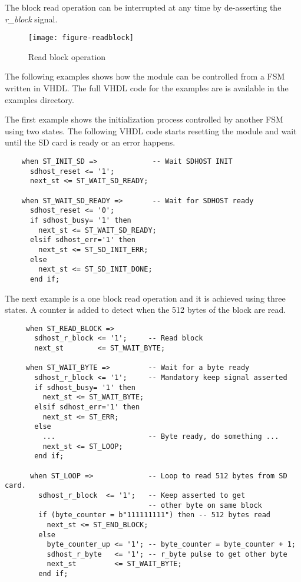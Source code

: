 \documentclass[oneside]{article}
\begin{document}
The block read operation can be interrupted at any time by de-asserting the
\emph{r\_block} signal.

\begin{figure}[H]
\centering
\texttt{[image: figure-readblock]}
\caption{Read block operation}
\label{fig-readblock}
\end{figure}

The following examples shows how the module can be controlled from a FSM 
written in VHDL. The full VHDL code for the examples are is available in the 
examples directory.

The first example shows the initialization process controlled by another FSM 
using two states. The following VHDL code  starts resetting the module and wait 
until the SD card is ready or an error happens. 

\begin{verbatim}
    when ST_INIT_SD =>             -- Wait SDHOST INIT
      sdhost_reset <= '1';
      next_st <= ST_WAIT_SD_READY;

    when ST_WAIT_SD_READY =>       -- Wait for SDHOST ready
      sdhost_reset <= '0';
      if sdhost_busy= '1' then 
        next_st <= ST_WAIT_SD_READY;
      elsif sdhost_err='1' then 
        next_st <= ST_SD_INIT_ERR;
      else
        next_st <= ST_SD_INIT_DONE;
      end if;
\end{verbatim}

The next example is a one block read operation and it is achieved using three 
states. A counter is added to detect when the 512 bytes of the block are read.

\begin{verbatim}
     when ST_READ_BLOCK =>
       sdhost_r_block <= '1';     -- Read block
       next_st        <= ST_WAIT_BYTE;

     when ST_WAIT_BYTE =>         -- Wait for a byte ready
       sdhost_r_block <= '1';     -- Mandatory keep signal asserted
       if sdhost_busy= '1' then 
         next_st <= ST_WAIT_BYTE;
       elsif sdhost_err='1' then 
         next_st <= ST_ERR;
       else                      
         ...                      -- Byte ready, do something ...
         next_st <= ST_LOOP;
       end if;

      when ST_LOOP =>             -- Loop to read 512 bytes from SD card.
        sdhost_r_block  <= '1';   -- Keep asserted to get 
                                  -- other byte on same block
        if (byte_counter = b"111111111") then -- 512 bytes read
          next_st <= ST_END_BLOCK;
        else
          byte_counter_up <= '1'; -- byte_counter = byte_counter + 1;
          sdhost_r_byte   <= '1'; -- r_byte pulse to get other byte
          next_st         <= ST_WAIT_BYTE;
        end if;
\end{verbatim}
\end{document}
